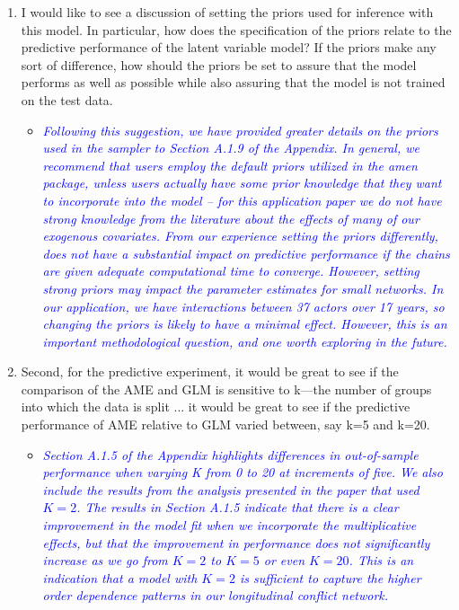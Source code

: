 \begin{enumerate}
	\item I would like to see a discussion of setting the priors used for inference with this model. In particular, how does the specification of the priors relate to the predictive performance of the latent variable model? If the priors make any sort of difference, how should the priors be set to assure that the model performs as well as possible while also assuring that the model is not trained on the test data.
	\begin{itemize}
		\item \textcolor{blue}{ \emph{
		Following this suggestion, we have provided greater details on the priors used in the sampler to Section A.1.9 of the Appendix. In general, we recommend that users employ the default priors utilized in the amen package, unless users actually have some prior knowledge that they want to incorporate into the model -- for this application paper we do not have strong knowledge from the literature about the effects of many of our exogenous covariates. From our experience setting the priors differently, does not have a substantial impact on predictive performance if the chains are given adequate computational time to converge. However, setting strong priors may impact the parameter estimates for small networks. In our application, we have interactions between 37 actors over 17 years, so changing the priors is likely to have a minimal effect. However, this is an important methodological question, and one worth exploring in the future.
		}}
	\end{itemize}	
	\item Second, for the predictive experiment, it would be great to see if the comparison of the AME and GLM is sensitive to k---the number of groups into which the data is split ... it would be great to see if the predictive performance of AME relative to GLM varied between, say k=5 and k=20.
	\begin{itemize}
		\item \textcolor{blue}{ \emph{
		Section A.1.5 of the Appendix highlights differences in out-of-sample performance when varying K from 0 to 20 at increments of five. We also include the results from the analysis presented in the paper that used $K=2$. The results in Section A.1.5 indicate that there is a clear improvement in the model fit when we incorporate the multiplicative effects, but that the improvement in performance does not significantly increase as we go from $K=2$ to $K=5$ or even $K=20$. This is an indication that a model with $K=2$ is sufficient to capture the higher order dependence patterns in our longitudinal conflict network. 
		}}
	\end{itemize}	
\end{enumerate}